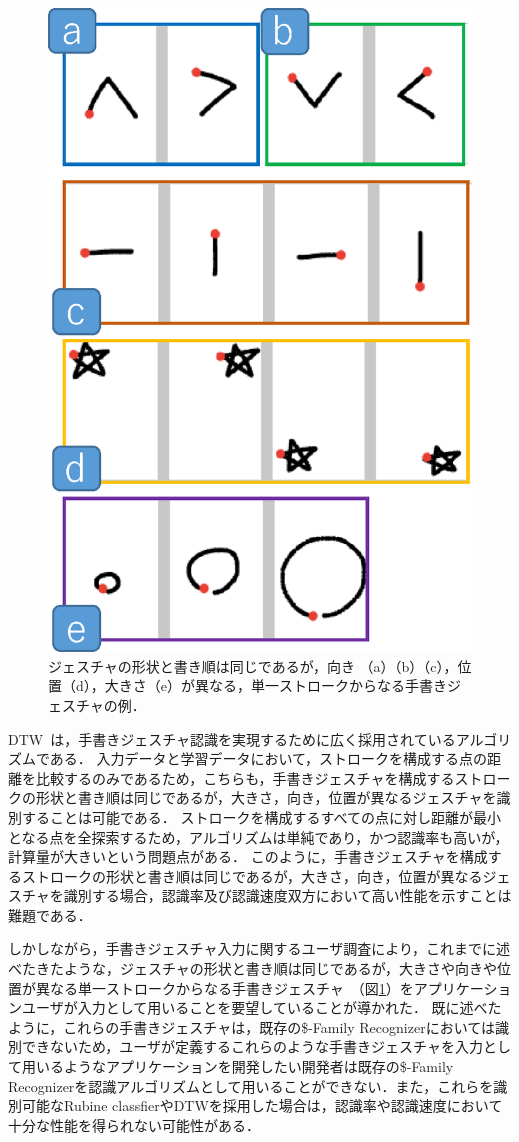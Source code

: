 \begin{figure} [htbp]
\centering
\includegraphics [width=0.5\columnwidth]{img/examples_V.eps}
\caption{ジェスチャの形状と書き順は同じであるが，向き （a）（b）（c），位置（d），大きさ（e）が異なる，単一ストロークからなる手書きジェスチャの例．}
\label{fig:examples_V}
\end{figure}

DTW~\cite{Tappert:1982:CSR:1664966.1664979, Salvador:2007:TAD:1367985.1367993}は，手書きジェスチャ認識を実現するために広く採用されているアルゴリズムである．
入力データと学習データにおいて，ストロークを構成する点の距離を比較するのみであるため，こちらも，手書きジェスチャを構成するストロークの形状と書き順は同じであるが，大きさ，向き，位置が異なるジェスチャを識別することは可能である．
ストロークを構成するすべての点に対し距離が最小となる点を全探索するため，アルゴリズムは単純であり，かつ認識率も高いが，計算量が大きいという問題点がある．
このように，手書きジェスチャを構成するストロークの形状と書き順は同じであるが，大きさ，向き，位置が異なるジェスチャを識別する場合，認識率及び認識速度双方において高い性能を示すことは難題である．

しかしながら，手書きジェスチャ入力に関するユーザ調査により，これまでに述べたきたような，ジェスチャの形状と書き順は同じであるが，大きさや向きや位置が異なる単一ストロークからなる手書きジェスチャ~（図\ref{fig:examples_V}）をアプリケーションユーザが入力として用いることを要望していることが導かれた．
既に述べたように，これらの手書きジェスチャは，既存の\$-Family Recognizerにおいては識別できないため，ユーザが定義するこれらのような手書きジェスチャを入力として用いるようなアプリケーションを開発したい開発者は既存の\$-Family Recognizerを認識アルゴリズムとして用いることができない．また，これらを識別可能なRubine classfierやDTWを採用した場合は，認識率や認識速度において十分な性能を得られない可能性がある．


